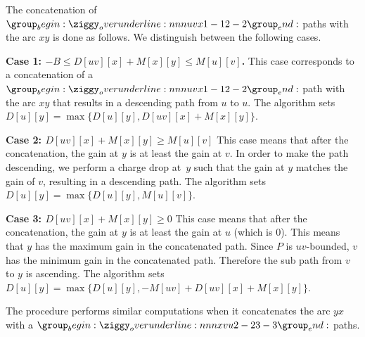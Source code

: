 \documentclass[11pt]{article}
\begin{document}
The concatenation of $\overunderline{uvx}{1-1}{2-2}$ paths with the arc $xy$ is done as follows. We distinguish between the following cases.

\textbf{Case 1: $-B \le D[uv][x]+M[x][y]\le M[u][v]$.}
This case corresponds to a concatenation of a $\overunderline{uvx}{1-1}{2-2}$ path with the arc $xy$ that results in a descending path from $u$ to $u$. The algorithm sets $D[u][y] = \max \{   D[u][y],D[uv][x]+M[x][y]\}$.

\textbf{Case 2: $D[uv][x]+M[x][y] \ge M[u][v]$}
This case means that after the concatenation, the gain at $y$ is at least the gain at $v$. In order to make the path descending, we perform a charge drop at~$y$ such that the gain at $y$ matches the gain of $v$, resulting in a descending path. The algorithm sets $D[u][y] = \max \{   D[u][y], M[u][v]\}$.

\textbf{Case 3: $D[uv][x]+M[x][y] \ge 0$}
This case means that after the concatenation, the gain at $y$ is at least the gain at $u$ (which is $0$). This means that $y$ has the maximum gain in the concatenated path. Since $P$ is $uv$-bounded, $v$ has the minimum gain in the concatenated path. Therefore the sub path from $v$ to $y$ is ascending. The algorithm sets $D[u][y] = \max \{   D[u][y], -M[uv] + D[uv][x]+M[x][y]\}$.

The procedure performs similar computations when it concatenates the arc $yx$ with a $\overunderline{xvu}{2-2}{3-3}$ paths.
\end{document}

